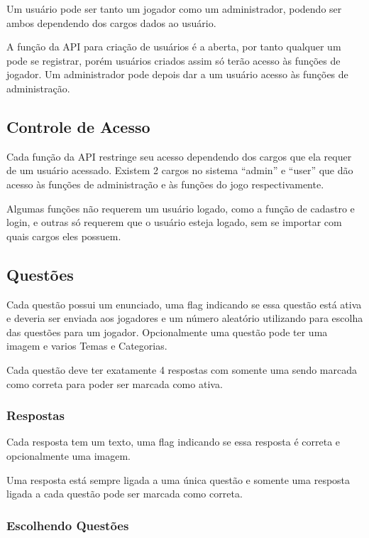 Um usuário pode ser tanto um jogador como um administrador, podendo ser ambos dependendo dos cargos dados ao usuário. 

A função da API para criação de usuários é a aberta, por tanto qualquer um pode se registrar, porém usuários criados assim só terão acesso às funções de jogador. Um administrador pode depois dar a um usuário acesso às funções de administração.

\subsection{Controle de Acesso}
\label{subsec:acesso}

Cada função da API restringe seu acesso dependendo dos cargos que ela requer de um usuário acessado. Existem 2 cargos no sistema “admin” e “user” que dão acesso às funções de administração e às funções do jogo respectivamente.

Algumas funções não requerem um usuário logado, como a função de cadastro e login, e outras só requerem que o usuário esteja logado, sem se importar com quais cargos eles possuem.

\subsection{Questões}
\label{subsec:questoes}

Cada questão possui um enunciado, uma flag indicando se essa questão está ativa e deveria ser enviada aos jogadores e um número aleatório utilizando para escolha das questões para um jogador. Opcionalmente uma questão pode ter uma imagem e varios Temas e Categorias. 

Cada questão deve ter exatamente 4 respostas com somente uma sendo marcada como correta para poder ser marcada como ativa. 

\subsubsection{Respostas}
\label{subsubsec:respostas}

Cada resposta tem um texto, uma flag indicando se essa resposta é correta e opcionalmente uma imagem. 

Uma resposta está sempre ligada a uma única questão e somente uma resposta ligada a cada questão pode ser marcada como correta. 


\subsubsection{Escolhendo Questões}
\label{subsubsec:escolhendo}

